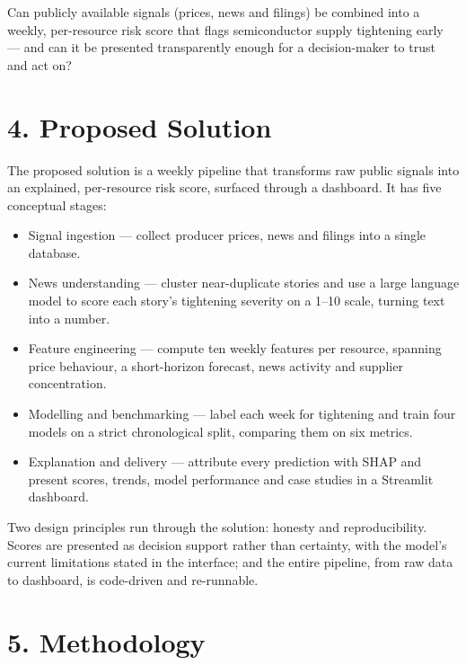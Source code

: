 \documentclass[11pt]{article}
\begin{document}
Can publicly available signals (prices, news and filings) be combined into a weekly, per-resource risk score that flags semiconductor supply tightening early --- and can it be presented transparently enough for a decision-maker to trust and act on?

\section{4. Proposed Solution}

The proposed solution is a weekly pipeline that transforms raw public signals into an explained, per-resource risk score, surfaced through a dashboard. It has five conceptual stages:

\begin{itemize}[topsep=4pt]
\item Signal ingestion --- collect producer prices, news and filings into a single database.
\item News understanding --- cluster near-duplicate stories and use a large language model to score each story's tightening severity on a 1--10 scale, turning text into a number.
\item Feature engineering --- compute ten weekly features per resource, spanning price behaviour, a short-horizon forecast, news activity and supplier concentration.
\item Modelling and benchmarking --- label each week for tightening and train four models on a strict chronological split, comparing them on six metrics.
\item Explanation and delivery --- attribute every prediction with SHAP and present scores, trends, model performance and case studies in a Streamlit dashboard.
\end{itemize}

Two design principles run through the solution: honesty and reproducibility. Scores are presented as decision support rather than certainty, with the model's current limitations stated in the interface; and the entire pipeline, from raw data to dashboard, is code-driven and re-runnable.

\section{5. Methodology}
\end{document}

